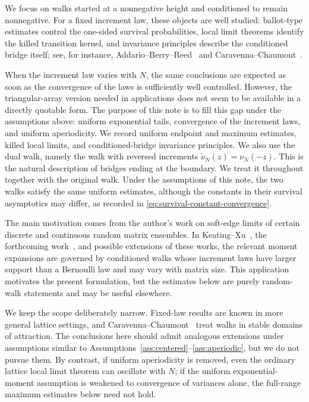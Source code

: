 \documentclass[11pt]{article}
\theoremstyle{plain}
\theoremstyle{definition}
\theoremstyle{remark}
\begin{document}
We focus on walks started at a nonnegative height and conditioned to
remain nonnegative. For a fixed increment law, these
objects are well studied: ballot-type estimates control the one-sided
survival probabilities, local limit theorems identify
the killed transition kernel, and invariance principles describe the
conditioned bridge itself; see, for instance,
Addario--Berry--Reed~\cite{ABR} and
Caravenna--Chaumont~\cite{CCbridge}.

When the increment law varies with \(N\), the same conclusions are
expected as soon as the convergence of the laws is sufficiently well
controlled. However, the triangular-array version needed in applications
does not seem to be available in a directly quotable form. The purpose
of this note is to fill this gap under the assumptions above: uniform
exponential tails, convergence of the increment laws, and uniform
aperiodicity. We record uniform endpoint and maximum estimates, killed local
limits, and conditioned-bridge invariance principles. We also use the dual
walk, namely the walk with reversed increments
\(\check\nu_N(z)=\nu_N(-z)\). This is the natural description of bridges
ending at the boundary. We treat it throughout together with the
original walk. Under the assumptions of this note, the two walks satisfy the
same uniform estimates, although the constants in their survival
asymptotics may differ, as recorded in
\eqref{eq:survival-constant-convergence}.

The main motivation comes from the author's work on soft-edge limits of
certain discrete and continuous random matrix ensembles. In
Keating--Xu~\cite{KX}, the forthcoming work~\cite{XuForthcoming}, and
possible extensions of these works, the relevant moment expansions are
governed by conditioned walks whose increment laws have larger support than a
Bernoulli law and may vary with matrix size. This application motivates
the present formulation, but the estimates below are purely random-walk
statements and may be useful elsewhere.

We keep the scope deliberately narrow. Fixed-law results are known in more
general lattice settings, and Caravenna--Chaumont~\cite{CCbridge} treat
walks in stable domains of attraction. The conclusions here should admit
analogous extensions under assumptions similar to
Assumptions~\ref{ass:centered}--\ref{ass:aperiodic}, but we do not pursue
them. By contrast, if
uniform aperiodicity is removed, even the ordinary lattice local limit theorem
can oscillate with \(N\); if the uniform exponential-moment assumption
is weakened to convergence of variances alone, the full-range maximum
estimates below need not hold.
\end{document}
